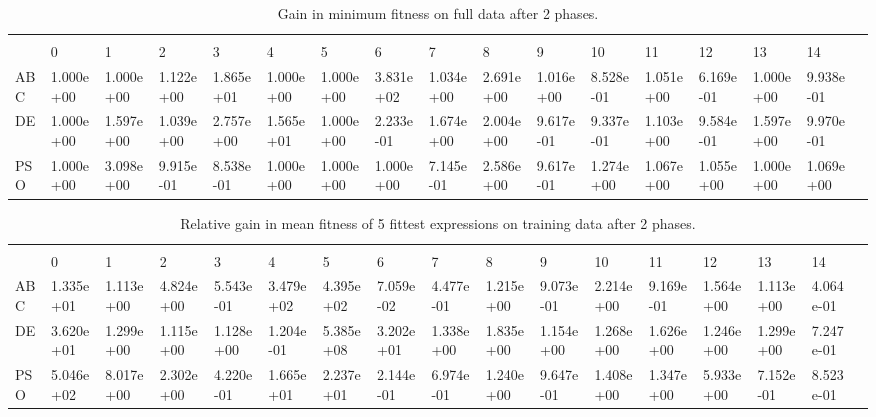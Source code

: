 \begin{landscape}
\begin{table}[]
\centering
\caption{Gain in minimum fitness on full data after 2 phases.}
\label{table:2phaseminfull}
\begin{adjustbox}{width=1.7\textwidth}
\begin{tabular}{lllllllllllllllll}
         &           &           &           &           &           &           &           &           &           &           &           &           &           &           &           &  \\
         & 0         & 1         & 2         & 3         & 4         & 5         & 6         & 7         & 8         & 9         & 10        & 11        & 12        & 13        & 14        &  \\
ABC                 & 1.000e+00 & 1.000e+00 & 1.122e+00 & 1.865e+01 & 1.000e+00 & 1.000e+00 & 3.831e+02 & 1.034e+00 & 2.691e+00 & 1.016e+00 & 8.528e-01 & 1.051e+00 & 6.169e-01 & 1.000e+00 & 9.938e-01 &  \\
DE                  & 1.000e+00 & 1.597e+00 & 1.039e+00 & 2.757e+00 & 1.565e+01 & 1.000e+00 & 2.233e-01 & 1.674e+00 & 2.004e+00 & 9.617e-01 & 9.337e-01 & 1.103e+00 & 9.584e-01 & 1.597e+00 & 9.970e-01 &  \\
PSO                 & 1.000e+00 & 3.098e+00 & 9.915e-01 & 8.538e-01 & 1.000e+00 & 1.000e+00 & 1.000e+00 & 7.145e-01 & 2.586e+00 & 9.617e-01 & 1.274e+00 & 1.067e+00 & 1.055e+00 & 1.000e+00 & 1.069e+00 &  \\
\end{tabular}
\end{adjustbox}
\end{table}

\begin{table}[]
\centering
\caption{Relative gain in mean fitness of 5 fittest expressions on training data after 2 phases.}
\label{table:2phasemeantrain}
\begin{adjustbox}{width=1.7\textwidth}
\begin{tabular}{lllllllllllllllll}
&           &           &           &           &           &           &           &           &           &           &           &           &           &           &           &  \\
           & 0         & 1         & 2         & 3         & 4         & 5         & 6         & 7         & 8         & 9         & 10        & 11        & 12        & 13        & 14        &  \\
ABC                 & 1.335e+01 & 1.113e+00 & 4.824e+00 & 5.543e-01 & 3.479e+02 & 4.395e+02 & 7.059e-02 & 4.477e-01 & 1.215e+00 & 9.073e-01 & 2.214e+00 & 9.169e-01 & 1.564e+00 & 1.113e+00 & 4.064e-01 &  \\
DE                  & 3.620e+01 & 1.299e+00 & 1.115e+00 & 1.128e+00 & 1.204e-01 & 5.385e+08 & 3.202e+01 & 1.338e+00 & 1.835e+00 & 1.154e+00 & 1.268e+00 & 1.626e+00 & 1.246e+00 & 1.299e+00 & 7.247e-01 &  \\
PSO                 & 5.046e+02 & 8.017e+00 & 2.302e+00 & 4.220e-01 & 1.665e+01 & 2.237e+01 & 2.144e-01 & 6.974e-01 & 1.240e+00 & 9.647e-01 & 1.408e+00 & 1.347e+00 & 5.933e+00 & 7.152e-01 & 8.523e-01 &  \\



\end{tabular}
\end{adjustbox}
\end{table}
\end{landscape}
